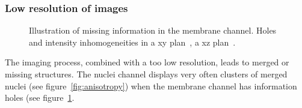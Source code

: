 \subsubsection{Low resolution of images}
\begin{figure}[htb]
  \centering
  \captionsetup[subfloat]{labelformat=empty}
  \hspace{5pt}
\caption{%
Illustration of missing information in the membrane channel. Holes and intensity inhomogeneities in a xy plan~, a xz plan~.}
\label{fig:holesMembrane}
\end{figure}
The imaging process, combined with a too low resolution, leads to merged or missing structures. The nuclei channel displays very often clusters of merged nuclei (see figure~\ref{fig:anisotropy}) when the membrane channel has information holes (see figure~\ref{fig:holesMembrane}.



